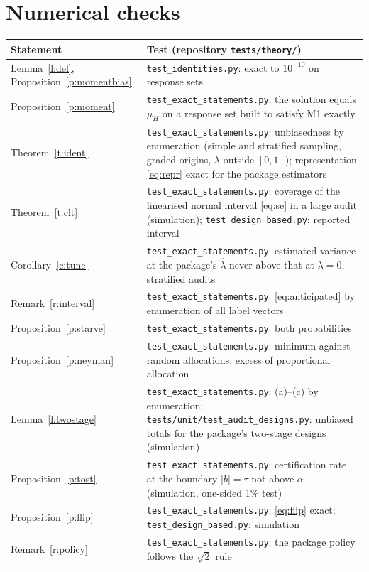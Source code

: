 \documentclass[11pt]{article}
\theoremstyle{definition}
\newcommand{\muH}{\mu_H}
\begin{document}
\section*{Numerical checks}
{\small\begin{tabular}{@{}lp{10.2cm}@{}}\toprule
Statement & Test (repository \texttt{tests/theory/})\\\midrule
Lemma~\ref{l:del}, Proposition~\ref{p:momentbias} & \texttt{test\_identities.py}: exact to $10^{-10}$ on response sets\\
Proposition~\ref{p:moment} & \texttt{test\_exact\_statements.py}: the solution equals $\muH$ on a response set built to satisfy M1 exactly\\
Theorem~\ref{t:ident} & \texttt{test\_exact\_statements.py}: unbiasedness by enumeration (simple and stratified sampling, graded origins, $\lambda$ outside $[0,1]$); representation \eqref{eq:repr} exact for the package estimators\\
Theorem~\ref{t:clt} & \texttt{test\_exact\_statements.py}: coverage of the linearised normal interval \eqref{eq:se} in a large audit (simulation); \texttt{test\_design\_based.py}: reported interval\\
Corollary~\ref{c:tune} & \texttt{test\_exact\_statements.py}: estimated variance at the package's $\hat\lambda$ never above that at $\lambda=0$, stratified audits\\
Remark~\ref{r:interval} & \texttt{test\_exact\_statements.py}: \eqref{eq:anticipated} by enumeration of all label vectors\\
Proposition~\ref{p:starve} & \texttt{test\_exact\_statements.py}: both probabilities\\
Proposition~\ref{p:neyman} & \texttt{test\_exact\_statements.py}: minimum against random allocations; excess of proportional allocation\\
Lemma~\ref{l:twostage} & \texttt{test\_exact\_statements.py}: (a)--(c) by enumeration; \texttt{tests/unit/test\_audit\_designs.py}: unbiased totals for the package's two-stage designs (simulation)\\
Proposition~\ref{p:tost} & \texttt{test\_exact\_statements.py}: certification rate at the boundary $|b|=\tau$ not above $\alpha$ (simulation, one-sided 1\% test)\\
Proposition~\ref{p:flip} & \texttt{test\_exact\_statements.py}: \eqref{eq:flip} exact; \texttt{test\_design\_based.py}: simulation\\
Remark~\ref{r:policy} & \texttt{test\_exact\_statements.py}: the package policy follows the $\sqrt2$ rule\\\bottomrule
\end{tabular}}
\end{document}
